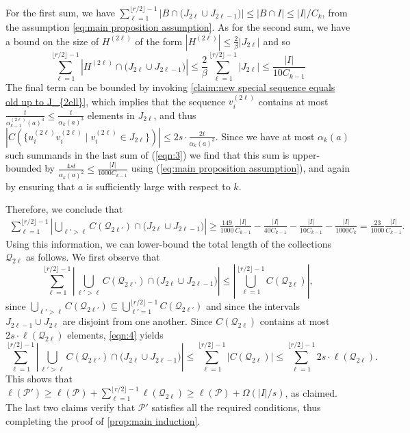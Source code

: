 \documentclass[a4paper,11pt]{article}
\makeatletter
\renewenvironment{proof}[1][\proofname] {\par\pushQED{\qed}\normalfont\topsep6\p@\@plus6\p@\relax\trivlist\item[\hskip\labelsep\bfseries#1\@addpunct{.}]\ignorespaces}{\popQED\endtrivlist\@endpefalse}
\theoremstyle{definition}
\def\cP{\mathcal{P}}
\def\cQ{\mathcal{Q}}
\newcommand{\ab}[1]{\lvert #1 \rvert}
\makeatother
\begin{document}
\begin{proof}
\begin{proof}
For the first sum, we have $\sum_{\ell=1}^{\lfloor r/2\rfloor -1} \left|B \cap \big(J_{2\ell}\cup J_{2\ell-1}\big)\right|\leq |B\cap I|\leq |I|/C_k$, from the assumption \eqref{eq:main proposition assumption}. As for the second sum, we have a bound on the size of $H^{(2\ell)}$ of the form $|H^{(2\ell)}|\leq \frac{2}{\beta}\ab{J_{2\ell}}$ and so 
\[\sum_{\ell=1}^{\lfloor r/2\rfloor -1} \left|H^{(2\ell)} \cap \big(J_{2\ell}\cup J_{2\ell-1}\big)\right|\leq \frac{2}{\beta} \sum_{\ell=1}^{\lfloor r/2\rfloor -1} \left|J_{2\ell}\right|\leq \frac{|I|}{10 C_{k-1}}\]
The final term can be bounded by invoking \cref{claim:new special sequence equals old up to J_{2ell}}, which implies that the sequence $v_i^{(2\ell)}$ contains at most $\frac{t}{\alpha_{k-1}^{(2\ell)}(a)^3}\leq \frac{t}{\alpha_k(a)^3}$ elements in $J_{2\ell}$, and thus $|C(\{u_i^{(2\ell)}v_i^{(2\ell)}\mid v_i^{(2\ell)}\in J_{2\ell}\})|\leq 2s\cdot \frac{2t}{\alpha_k(a)^3}$. Since we have at most $\alpha_k(a)$ such summands in the last sum of (\ref{eqn:3}) we find that this sum is upper-bounded by $\frac{4st}{\alpha_k(a)^2}\leq \frac{|I|}{1000C_{k-1}}$ using (\ref{eq:main proposition assumption}), and again by ensuring that $a$ is sufficiently large with respect to $k$.

Therefore, we conclude that 
\begin{align*}
    \sum_{\ell=1}^{\lfloor r/2\rfloor -1}\left|\bigcup_{\ell'>\ell} C(\cQ_{2\ell'}) \cap \big(J_{2\ell}\cup J_{2\ell-1}\big)\right|\geq \frac{149}{1000}\frac{|I|}{C_{k-1}}-\frac{|I|}{40C_{k-1}}-\frac{|I|}{10C_{k-1}}-\frac{|I|}{1000C_k}= \frac{23}{1000} \frac{|I|}{C_{k-1}}.
\end{align*}
Using this information, we can lower-bound the total length of the collections $\cQ_{2\ell}$ as follows. 
We first observe that
\begin{equation}\label{eqn:4}
\sum_{\ell=1}^{\lfloor r/2\rfloor -1}\left|\bigcup_{\ell'>\ell} C(\cQ_{2\ell'}) \cap \big(J_{2\ell}\cup J_{2\ell-1}\big)\right|\leq \left|\bigcup_{\ell=1}^{\lfloor r/2\rfloor -1} C(\cQ_{2\ell}) \right|,
\end{equation}
since $\bigcup_{\ell'>\ell} C(\cQ_{2\ell'})\subseteq \bigcup_{\ell'=1}^{\lfloor r/2\rfloor -1} C(\cQ_{2\ell'})$ and since the intervals $J_{2\ell-1}\cup J_{2\ell}$ are disjoint from one another.
Since $C(\cQ_{2\ell})$ contains at most $2s\cdot\ell(\cQ_{2\ell})$ elements, \eqref{eqn:4} yields
\[\sum_{\ell=1}^{\lfloor r/2\rfloor -1}\left|\bigcup_{\ell'>\ell} C(\cQ_{2\ell'}) \cap \big(J_{2\ell}\cup J_{2\ell-1}\big)\right|\leq \sum_{\ell=1}^{\lfloor r/2\rfloor-1} \ab{C(\cQ_{2\ell})}\leq \sum_{\ell=1}^{\lfloor r/2\rfloor -1}2s\cdot \ell(\cQ_{2\ell}).\]
This shows that $\ell(\cP')\geq \ell(\cP)+\sum_{\ell=1}^{\lfloor r/2\rfloor -1}\ell(\cQ_{2\ell})\geq \ell(\cP)+\Omega(|I|/s)$, as claimed.
\end{proof}
The last two claims verify that $\cP'$ satisfies all the required conditions, thus completing the proof of \cref{prop:main induction}.
\end{proof}
\end{document}
